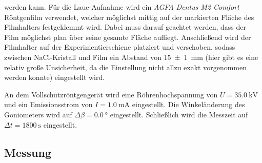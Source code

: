 werden kann. Für die Laue-Aufnahme wird ein \textit{AGFA Dentus M2 Comfort} Röntgenfilm verwendet, welcher möglichst mittig auf der markierten Fläche
des Filmhalters festgeklemmt wird. Dabei muss darauf geachtet werden, dass der Film möglichst plan über seine gesamte Fläche aufliegt. Anschließend wird der Filmhalter
auf der Experimentierschiene platziert und verschoben, sodass zwischen NaCl-Kristall und Film ein Abstand von \SI{15(1)}{\milli \meter} (hier gibt es eine relativ große Unsicherheit,
da die Einstellung nicht allzu exakt vorgenommen werden konnte) eingestellt wird.\par
An dem Vollschutzröntgengerät wird eine Röhrenhochspannung von $U = \SI{35,0}{\kilo \volt}$ und ein Emissionsstrom von $I = \SI{1,0}{\milli \ampere}$ eingestellt.
Die Winkeländerung des Goniometers wird auf $\Delta \beta = \SI{0,0}{\degree}$ eingestellt. Schließlich wird die Messzeit auf $\Delta t = \SI{1800}{\second}$ eingestellt.
\subsection{Messung}\label{subsec:laue_messung}
